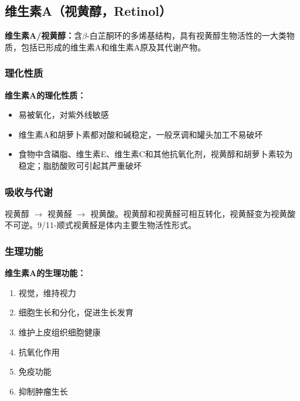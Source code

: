 \subsection{维生素A（视黄醇，Retinol）}

\begin{defbox}
\textbf{维生素A/视黄醇：}含$\beta$-白芷酮环的多烯基结构，具有视黄醇生物活性的一大类物质，包括已形成的维生素A和维生素A原及其代谢产物。
\end{defbox}

\subsubsection{理化性质}

\begin{tipbox}
\textbf{维生素A的理化性质：}
\begin{itemize}[leftmargin=*]
    \item 易被氧化，对紫外线敏感
    \item 维生素A和胡萝卜素都对酸和碱稳定，一般烹调和罐头加工不易破坏
    \item 食物中含磷脂、维生素E、维生素C和其他抗氧化剂，视黄醇和胡萝卜素较为稳定；脂肪酸败可引起其严重破坏
\end{itemize}
\end{tipbox}

\subsubsection{吸收与代谢}

\begin{tipbox}
视黄醇 $\rightarrow$ 视黄醛 $\rightarrow$ 视黄酸。视黄醇和视黄醛可相互转化，视黄醛变为视黄酸不可逆。9/11-顺式视黄醛是体内主要生物活性形式。
\end{tipbox}

\subsubsection{生理功能}

\begin{keybox}
\textbf{维生素A的生理功能：}
\begin{enumerate}[leftmargin=*]
    \item 视觉，维持视力
    \item 细胞生长和分化，促进生长发育
    \item 维护上皮组织细胞健康
    \item 抗氧化作用
    \item 免疫功能
    \item 抑制肿瘤生长
\end{enumerate}
\end{keybox}

